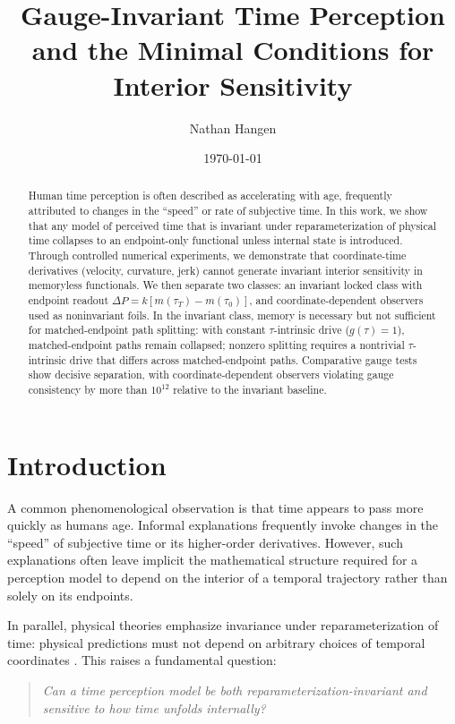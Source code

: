 \documentclass[11pt]{article}
\title{Gauge-Invariant Time Perception and the Minimal Conditions for Interior Sensitivity}
\author{Nathan Hangen}
\date{\today}
\begin{document}
\maketitle

\begin{abstract}
Human time perception is often described as accelerating with age, frequently attributed to changes in the ``speed'' or rate of subjective time. In this work, we show that any model of perceived time that is invariant under reparameterization of physical time collapses to an endpoint-only functional unless internal state is introduced. Through controlled numerical experiments, we demonstrate that coordinate-time derivatives (velocity, curvature, jerk) cannot generate invariant interior sensitivity in memoryless functionals. We then separate two classes: an invariant locked class with endpoint readout $\Delta P = k[m(\tau_T)-m(\tau_0)]$, and coordinate-dependent observers used as noninvariant foils. In the invariant class, memory is necessary but not sufficient for matched-endpoint path splitting: with constant $\tau$-intrinsic drive ($g(\tau)=1$), matched-endpoint paths remain collapsed; nonzero splitting requires a nontrivial $\tau$-intrinsic drive that differs across matched-endpoint paths. Comparative gauge tests show decisive separation, with coordinate-dependent observers violating gauge consistency by more than $10^{12}$ relative to the invariant baseline.
\end{abstract}

\section{Introduction}

A common phenomenological observation is that time appears to pass more quickly as humans age. Informal explanations frequently invoke changes in the ``speed'' of subjective time or its higher-order derivatives. However, such explanations often leave implicit the mathematical structure required for a perception model to depend on the interior of a temporal trajectory rather than solely on its endpoints.

In parallel, physical theories emphasize invariance under reparameterization of time: physical predictions must not depend on arbitrary choices of temporal coordinates \citep{fulop1998reparam,bertschinger2002gauge,lord1971gauge}. This raises a fundamental question:

\begin{quote}
\emph{Can a time perception model be both reparameterization-invariant and sensitive to how time unfolds internally?}
\end{quote}
\end{document}
